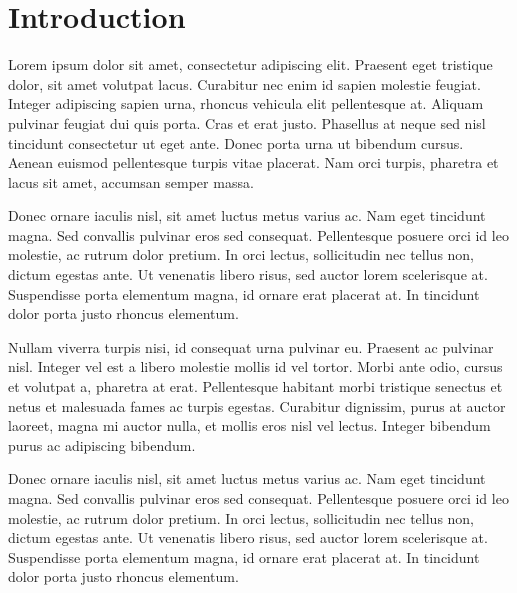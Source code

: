 \documentclass{acm_proc_article-sp}
\begin{document}

\section{Introduction}
Lorem ipsum dolor sit amet, consectetur adipiscing elit. Praesent eget
tristique dolor, sit amet volutpat lacus. Curabitur nec enim id sapien molestie
feugiat\cite{clark:pct}. Integer adipiscing sapien urna, rhoncus vehicula elit pellentesque at.
Aliquam pulvinar feugiat dui quis porta. Cras et erat justo. Phasellus at neque
sed nisl tincidunt consectetur ut eget ante. Donec porta urna ut bibendum
cursus. Aenean euismod pellentesque turpis vitae placerat. Nam orci turpis,
pharetra et lacus sit amet, accumsan semper massa. 

%
Donec ornare iaculis nisl, sit amet luctus metus varius ac. Nam eget tincidunt
magna. Sed convallis pulvinar eros sed consequat. Pellentesque posuere orci id
leo molestie, ac rutrum dolor pretium. In orci lectus, sollicitudin nec tellus
non, dictum egestas ante. Ut venenatis libero risus, sed auctor lorem
scelerisque at. Suspendisse porta elementum magna, id ornare erat placerat at.
In tincidunt dolor porta justo rhoncus elementum.

Nullam viverra turpis nisi, id consequat urna pulvinar eu. Praesent ac pulvinar
nisl. Integer vel est a libero molestie mollis id vel tortor. Morbi ante odio,
cursus et volutpat a, pharetra at erat. Pellentesque habitant morbi tristique
senectus et netus et malesuada fames ac turpis egestas. Curabitur dignissim,
purus at auctor laoreet, magna mi auctor nulla, et mollis eros nisl vel lectus.
Integer bibendum purus ac adipiscing bibendum.

Donec ornare iaculis nisl, sit amet luctus metus varius ac. Nam eget tincidunt
magna. Sed convallis pulvinar eros sed consequat. Pellentesque posuere orci id
leo molestie, ac rutrum dolor pretium. In orci lectus, sollicitudin nec tellus
non, dictum egestas ante. Ut venenatis libero risus, sed auctor lorem
scelerisque at. Suspendisse porta elementum magna, id ornare erat placerat at.
In tincidunt dolor porta justo rhoncus elementum.
\end{document}
